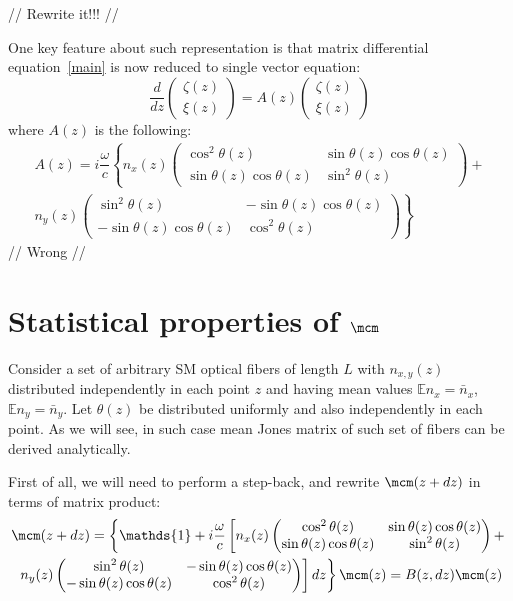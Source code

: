 \documentclass[12pt, notitlepage]{report}
\begin{document}
// Rewrite it!!! //

One key feature about such representation is that matrix differential equation~\eqref{main} is now reduced to single vector equation:
\begin{equation}
	\label{mainvec}
	\dfrac{d}{dz} \begin{pmatrix}
		\zeta(z) \\
		\xi(z)
	\end{pmatrix} = A(z) \begin{pmatrix}
	\zeta(z) \\
	\xi(z)
\end{pmatrix}
\end{equation}
where $A(z)$ is the following:
\begin{multline*}
	A(z) = i\dfrac{\omega}{c}\left\{n_x(z)\begin{pmatrix}
		\cos^2\theta(z) & \sin\theta(z)\cos\theta(z) \\
		\sin\theta(z)\cos\theta(z) & \sin^2\theta(z)
	\end{pmatrix} + \right. \\ \left.
	n_y(z)\begin{pmatrix}
		\sin^2\theta(z) & -\sin\theta(z)\cos\theta(z) \\
		-\sin\theta(z)\cos\theta(z) & \cos^2\theta(z)
	\end{pmatrix}
	\right\}
\end{multline*}
// Wrong //


\section{Statistical properties of $\mcm$}
Consider a set of arbitrary SM optical fibers of length $L$ with $n_{x,y}(z)$ distributed independently in each point $z$ and having mean values $\mathbb{E}n_x = \bar{n}_x$, $\mathbb{E}n_y = \bar{n}_y$. Let $\theta(z)$ be distributed uniformly and also independently in each point. As we will see, in such case mean Jones matrix of such set of fibers can be derived analytically.

First of all, we will need to perform a step-back, and rewrite $\mcm(z+dz)$ in terms of matrix product:
\begin{multline*}
	\mcm(z+ dz) = \left\{\mathds{1} + i\dfrac{\omega}{c}\left[n_x(z)
	\begin{pmatrix}
		\cos^2\theta(z) & \sin\theta(z)\cos\theta(z) \\
		\sin\theta(z)\cos\theta(z) & \sin^2\theta(z)
	\end{pmatrix} + \right.\right.\\ \left.\left.
	n_y(z) 
	\begin{pmatrix}
		\sin^2\theta(z) & -\sin\theta(z)\cos\theta(z) \\
		-\sin\theta(z)\cos\theta(z) & \cos^2\theta(z)
	\end{pmatrix}
	\right]dz\right\}\mcm(z) = B(z,dz)\mcm(z)
\end{multline*}
\end{document}

